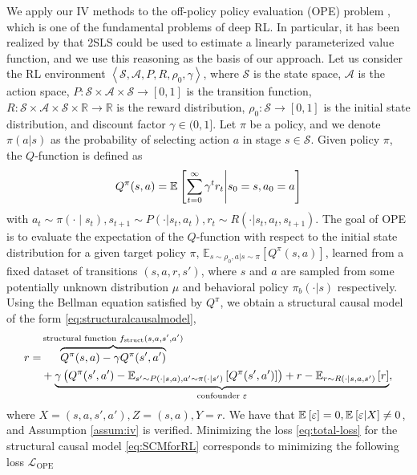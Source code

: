 We apply our IV methods to the off-policy policy evaluation (OPE) problem \citep{Sutton2018}, which is one of the fundamental problems of deep RL.
In particular, it has been realized by \cite{bradtke1996linear} that 2SLS could be used to estimate a linearly parameterized value function, and we use this reasoning as the basis of our approach.
Let us consider the RL environment $\left\langle\mathcal{S}, \mathcal{A}, P, R, \rho_0, \gamma \right\rangle$, where $\mathcal{S}$ is the state space, $\mathcal{A}$ is the action space,
$P: \mathcal{S} \times\mathcal{A} \times \mathcal{S} \to [0, 1]$ is the transition function,
$R: \mathcal{S} \times\mathcal{A} \times \mathcal{S} \times \mathbb{R} \to \mathbb{R}$ is the reward distribution,
$\rho_0: \mathcal{S} \to [0, 1]$ is the initial state distribution,
and discount factor $\gamma \in (0,1]$. Let $\pi$ be a policy, and we denote $\pi(a|s)$ as the probability of selecting action $a$ in stage $s\in\mathcal{S}$. Given policy $\pi$, the $Q$-function is defined as
\begin{align*}
    Q^{\pi}(s,a)=\expect{\sum_{t=0}^\infty \gamma^t r_t \middle| s_0=s, a_0=a}
\end{align*}
with $a_t\sim \pi(\cdot \mid s_t), s_{t+1}\sim P(\cdot | s_t, a_t), r_t \sim R(\cdot | s_t, a_t, s_{t+1})$. The goal of OPE is to evaluate the expectation of the $Q$-function with respect to the initial state distribution for a given target policy $\pi$, $\mathbb{E}_{s\sim \rho_0, a|s\sim \pi}[Q^{\pi}(s,a)]$, learned from a fixed dataset of transitions $(s, a, r, s')$, where $s$ and $a$ are sampled from some potentially unknown distribution $\mu$ and behavioral policy $\pi_b(\cdot|s)$ respectively. Using the Bellman equation satisfied by $Q^{\pi}$, we obtain a structural causal model of the form \eqref{eq:structuralcausalmodel},
\begin{align}\label{eq:SCMforRL}
    r=&\overbrace{Q^{\pi}(s,a)-\gamma Q^{\pi}(s',a')}^{\text{structural function~}f_{\mathrm{struct}}(s,a,s',a')}\\
       &+\underbrace{\gamma \left(Q^{\pi}(s',a')- \expect[s'\sim P(\cdot|s,a), a'\sim \pi(\cdot | s')]{Q^{\pi}(s',a')}\right)+r-\expect[r\sim R(\cdot | s, a,s')]{r}}_{\text{confounder~}\varepsilon}\nonumber,
\end{align}
where  $X = (s,a,s',a'), Z = (s,a), Y = r$.
We have that $\expect{\varepsilon} = 0, \expect{\varepsilon | X} \neq 0$, and Assumption \ref{assum:iv} is verified. Minimizing the loss \eqref{eq:total-loss} for the structural causal model \eqref{eq:SCMforRL} corresponds to minimizing the following loss $\mathcal{L}_{\mathrm{OPE}}$
